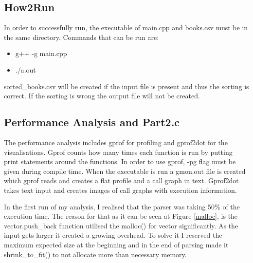 \subsection{How2Run}
In order to successfully run, the executable of main.cpp and books.csv must be in the same directory. 
Commands that can be run are:
\begin{itemize}
\item g++ -g main.cpp
\item ./a.out
\end{itemize}
sorted\_books.csv will be created if the input file is present and thus the sorting is correct. If the sorting is wrong the output file will not be created. 
\subsection{Performance Analysis and Part2.c}

The performance analysis includes gprof for profiling and gprof2dot for the visualisations. Gprof counts how many times each function is run by putting print statements around the functions. In order to use gprof, -pg flag must be given during compile time. When the executable is run a gmon.out file is created which gprof reads and creates a flat profile and a call graph in text. Gprof2dot takes text input and creates images of call graphs with execution information. 

In the first run of my analysis, I realised that the parser was taking 50\% of the execution time. The reason for that as it can be seen at Figure \ref{malloc}, is the vector.push\_back function utilised the malloc() for vector significantly. As the input gets larger it created a growing overhead. To solve it I reserved the maximum expected size at the beginning and in the end of parsing made it shrink\_to\_fit() to not allocate more than necessary memory. 

